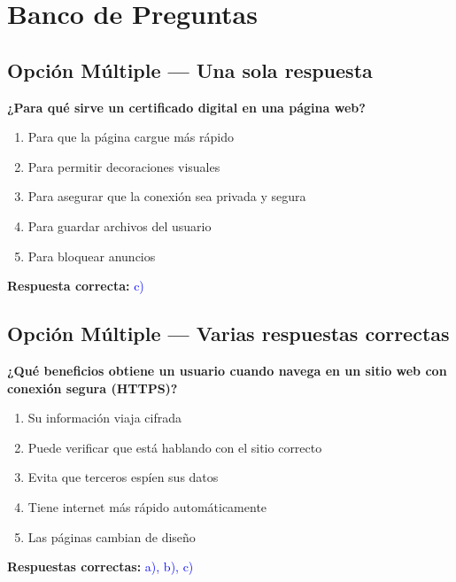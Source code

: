 \section{Banco de Preguntas}

\subsection{Opción Múltiple — Una sola respuesta}

\begin{tcolorbox}[title=\textbf{Pregunta 1: Selección única}]
\textbf{¿Para qué sirve un certificado digital en una página web?}

\begin{enumerate}[label=\alph*)]
    \item Para que la página cargue más rápido
    \item Para permitir decoraciones visuales
    \item Para asegurar que la conexión sea privada y segura
    \item Para guardar archivos del usuario
    \item Para bloquear anuncios
\end{enumerate}

\textbf{Respuesta correcta:} \textcolor{blue}{c)}
\end{tcolorbox}

\vspace{0.4cm}

\subsection{Opción Múltiple — Varias respuestas correctas}

\begin{tcolorbox}[title=\textbf{Pregunta 2: Selecciones múltiples}]
\textbf{¿Qué beneficios obtiene un usuario cuando navega en un sitio web con conexión segura (HTTPS)?}

\begin{enumerate}[label=\alph*)]
    \item Su información viaja cifrada
    \item Puede verificar que está hablando con el sitio correcto
    \item Evita que terceros espíen sus datos
    \item Tiene internet más rápido automáticamente
    \item Las páginas cambian de diseño
\end{enumerate}

\textbf{Respuestas correctas:} \textcolor{blue}{a), b), c)}
\end{tcolorbox}

